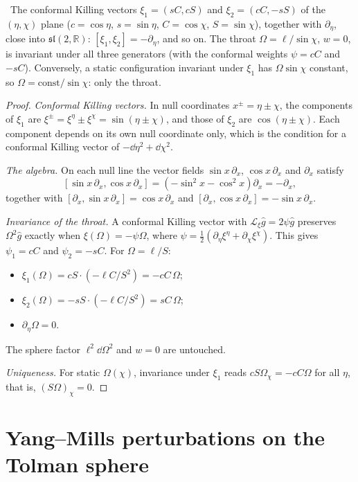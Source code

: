 \begin{proposition}\label{prop:sl2}\ver\
The conformal Killing vectors $\xi_1=(sC,cS)$ and $\xi_2=(cC,-sS)$ of the $(\eta,\chi)$ plane ($c=\cos\eta$, $s=\sin\eta$, $C=\cos\chi$, $S=\sin\chi$), together with $\partial_\eta$, close into $\mathfrak{sl}(2,\mathbb R)$: $[\xi_1,\xi_2]=-\partial_\eta$, and so on. The throat $\Omega=\ell/\sin\chi$, $w=0$, is invariant under all three generators (with the conformal weights $\psi=cC$ and $-sC$). Conversely, a static configuration invariant under $\xi_1$ has $\Omega\sin\chi$ constant, so $\Omega=\mathrm{const}/\sin\chi$: only the throat.
\end{proposition}
\begin{proof}
\emph{Conformal Killing vectors.} In null coordinates $x^\pm=\eta\pm\chi$, the components of $\xi_1$ are $\xi^\pm=\xi^\eta\pm\xi^\chi=\sin(\eta\pm\chi)$, and those of $\xi_2$ are $\cos(\eta\pm\chi)$. Each component depends on its own null coordinate only, which is the condition for a conformal Killing vector of $-\dd\eta^2+\dd\chi^2$.

\emph{The algebra.} On each null line the vector fields $\sin x\,\partial_x$, $\cos x\,\partial_x$ and $\partial_x$ satisfy
\[
[\sin x\,\partial_x,\cos x\,\partial_x]=(-\sin^2x-\cos^2x)\partial_x=-\partial_x ,
\]
together with $[\partial_x,\sin x\,\partial_x]=\cos x\,\partial_x$ and $[\partial_x,\cos x\,\partial_x]=-\sin x\,\partial_x$.

\emph{Invariance of the throat.} A conformal Killing vector with $\mathcal L_\xi\hat g=2\psi\hat g$ preserves $\Omega^2\hat g$ exactly when $\xi(\Omega)=-\psi\Omega$, where $\psi=\frac12(\partial_\eta\xi^\eta+\partial_\chi\xi^\chi)$. This gives $\psi_1=cC$ and $\psi_2=-sC$. For $\Omega=\ell/S$:
\begin{itemize}[nosep]
\item $\xi_1(\Omega)=cS\cdot(-\ell C/S^2)=-cC\,\Omega$;
\item $\xi_2(\Omega)=-sS\cdot(-\ell C/S^2)=sC\,\Omega$;
\item $\partial_\eta\Omega=0$.
\end{itemize}
The sphere factor $\ell^2\dd\Omega^2$ and $w=0$ are untouched.

\emph{Uniqueness.} For static $\Omega(\chi)$, invariance under $\xi_1$ reads $cS\Omega_\chi=-cC\Omega$ for all $\eta$, that is, $(S\Omega)_\chi=0$.
\end{proof}


\section{Yang--Mills perturbations on the Tolman sphere}

